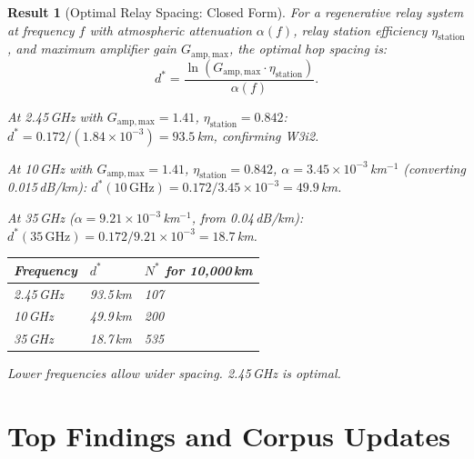 \documentclass[aps,prd,twocolumn,superscriptaddress]{revtex4-2}
\newtheorem{result}{Result}
\begin{document}
\begin{result}[Optimal Relay Spacing: Closed Form]
For a regenerative relay system at frequency $f$ with atmospheric
attenuation $\alpha(f)$, relay station efficiency $\eta_\mathrm{station}$,
and maximum amplifier gain $G_\mathrm{amp,max}$, the optimal hop spacing is:
\begin{equation}
\boxed{
d^* = \frac{\ln(G_\mathrm{amp,max}\cdot\eta_\mathrm{station})}{\alpha(f)}.
}
\label{eq:d_star_final}
\end{equation}

At 2.45\,GHz with $G_\mathrm{amp,max} = 1.41$, $\eta_\mathrm{station} = 0.842$:
$d^* = 0.172 / (1.84\times10^{-3}) = 93.5$\,km, confirming W3i2.

At 10\,GHz with $G_\mathrm{amp,max} = 1.41$, $\eta_\mathrm{station} = 0.842$,
$\alpha = 3.45\times10^{-3}$\,km$^{-1}$ (converting 0.015\,dB/km):
$d^*(10\,\mathrm{GHz}) = 0.172/3.45\times10^{-3} = 49.9$\,km.

At 35\,GHz ($\alpha = 9.21\times10^{-3}$\,km$^{-1}$, from 0.04\,dB/km):
$d^*(35\,\mathrm{GHz}) = 0.172/9.21\times10^{-3} = 18.7$\,km.

\begin{tabular}{lll}
\toprule
Frequency & $d^*$ & $N^*$ for 10,000\,km \\
\midrule
2.45\,GHz & 93.5\,km & 107 \\
10\,GHz & 49.9\,km & 200 \\
35\,GHz & 18.7\,km & 535 \\
\midrule
\end{tabular}

Lower frequencies allow wider spacing.  2.45\,GHz is optimal.
\end{result}

\section{Top Findings and Corpus Updates}
\label{sec:findings}
\end{document}
